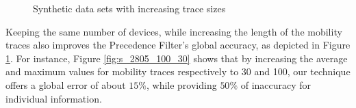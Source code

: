 \begin{figure}[htb]
\hspace*{-0.7em}
\hspace*{-0.7em}
\caption{Synthetic data sets with increasing trace sizes}
\label{fig:perf_results_sim_trace_size}
\end{figure}

Keeping the same number of devices, while increasing the length of the
mobility traces also improves the Precedence Filter's global accuracy, as
depicted in Figure \ref{fig:perf_results_sim_trace_size}. For instance,
Figure \ref{fig:s_2805_100_30} shows that by increasing the average
and maximum values for mobility traces respectively to 30 and 100, our
technique offers a global error of about $15\%$, while providing $50\%$
of inaccuracy for individual information.

